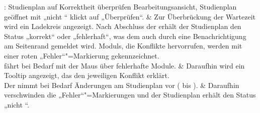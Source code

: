 \begin{usecase}{: Studienplan auf Korrektheit überprüfen}
	{Bearbeitungsansicht, \gls{Studienplan} geöffnet mit  „nicht “}
	 klickt auf „Überprüfen“.
	& Zur Überbrückung der Wartezeit wird ein Ladekreis angezeigt. \newline 
	Nach Abschluss der  erhält der Studienplan den Status „korrekt“ oder „fehlerhaft“, was dem  auch durch eine \gls{Benachrichtigung} am Seitenrand gemeldet wird. \glspl{Modul}, die Konflikte hervorrufen, werden mit einer roten „Fehler“"=Markierung gekennzeichnet. \\
	\hline
	 fährt bei Bedarf mit der Maus über fehlerhafte Module.
	& Daraufhin wird ein \gls{Tooltip} angezeigt, das den jeweiligen Konflikt erklärt. \\
	\hline
	Der  nimmt bei Bedarf Änderungen am Studienplan vor ( bis ). 
	& Daraufhin verschwinden die „Fehler“"=Markierungen und der Studienplan erhält den Status „nicht “.
\end{usecase}

